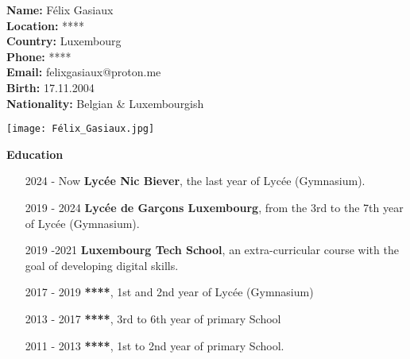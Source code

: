 \documentclass{article}
\begin{document}
\begin{minipage}[t]{0.4\textwidth}
    \begin{flushleft}
        \textbf{Name:} Félix Gasiaux \\
        \textbf{Location:} **** \\
        \textbf{Country:} Luxembourg\\
        \textbf{Phone:} **** \\
        \textbf{Email:} felixgasiaux@proton.me\\
        \textbf {Birth:} 17.11.2004 \\
        \textbf{Nationality:} Belgian \& Luxembourgish\\

    \end{flushleft}
\end{minipage}%
\begin{minipage}{0.55\textwidth}
    \begin{flushright}
        \texttt{[image: Félix\_Gasiaux.jpg]}
    \end{flushright}
\end{minipage}





\vspace{0.5cm} %
\centering %
\dotfill \textbf{\Large Education} \dotfill
\vspace{0.5cm} %

\begin{minipage}[t]{0.7\textwidth}
    \begin{itemize}
         \item [2024 - Now] \textbf{Lycée Nic Biever},  the last year of Lycée (Gymnasium).
        \item [2019 - 2024] \textbf{Lycée de Garçons Luxembourg}, from the 3rd to the 7th year of Lycée (Gymnasium).
    	\item [2019 -2021 ] \textbf{Luxembourg Tech School}, an extra-curricular course with the goal of developing digital skills.
        \item [2017 - 2019] \textbf{****}, 1st and 2nd year of Lycée (Gymnasium)
        \item [2013 - 2017] \textbf{****}, 3rd to 6th year of primary School
        \item [2011 - 2013] \textbf{****}, 1st to 2nd year of primary School.

        \end{itemize}
\end{minipage}%
\end{document}
